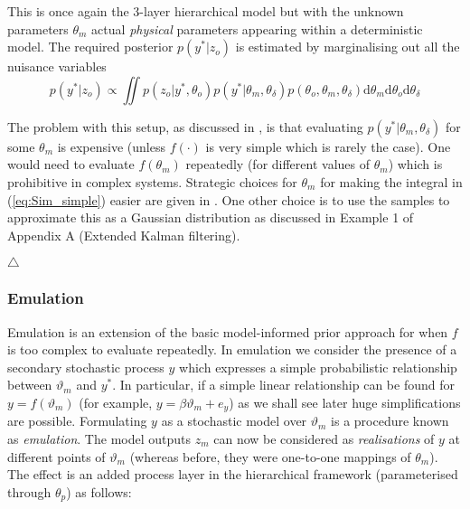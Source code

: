 \documentclass[10pt,a4paper]{article}
\newcommand\xqed[1]{%
  \leavevmode\unskip\penalty9999 \hbox{}\nobreak\hfill
  \quad\hbox{#1}}
\newcommand\demo{\xqed{$\triangle$}}
\newcommand{\intd} {\textrm{d}}
\begin{document}
\noindent This is once again the 3-layer hierarchical model but with the unknown parameters $\theta_m$ actual \emph{physical} parameters appearing within a deterministic model. The required posterior $p(y^* | z_o)$ is estimated by marginalising out all the nuisance variables
\begin{equation}\label{eq:Sim_simple}
p(y^*|z_o) \propto \iint p(z_o | y^*, \theta_o)p(y^* |\theta_m, \theta_\delta)p(\theta_o, \theta_m, \theta_\delta) \intd \theta_m \intd\theta_o \intd\theta_\delta
\end{equation}

The problem with this setup, as discussed in \citep{Higdon_2004}, is that evaluating $p(y^* | \theta_m, \theta_\delta)$ for some $\theta_m$ is expensive (unless $f(\cdot)$ is very simple which is rarely the case). One would need to evaluate $f(\theta_m)$ repeatedly (for different values of $\theta_m$) which is  prohibitive in complex systems. Strategic choices for $\theta_m$ for making the integral in (\ref{eq:Sim_simple}) easier are given in \cite{Rougier_2007}. One other choice is to use the samples to approximate this as a Gaussian distribution as discussed in Example 1 of Appendix A (Extended Kalman filtering).


\demo


\subsubsection*{Emulation}

Emulation is an extension of the basic model-informed prior approach for when $f$ is too complex to evaluate repeatedly. In emulation we consider the presence of a secondary stochastic process $y$ which expresses a simple probabilistic relationship between $\vartheta_m$ and $y^*$. In particular, if a simple linear relationship can be found for $y = f(\vartheta_m)$ (for example, $y = \beta\vartheta_m + e_y$) as we shall see later huge simplifications are possible. Formulating $y$ as a stochastic model over $\vartheta_m$ is a procedure known as \emph{emulation}. The model outputs $z_m$ can now be considered as \emph{realisations} of $y$ at different points of $\vartheta_m$ (whereas before, they were one-to-one mappings of $\theta_m$). The effect is an added process layer in the hierarchical framework (parameterised through $\theta_p$) as follows:
\end{document}
